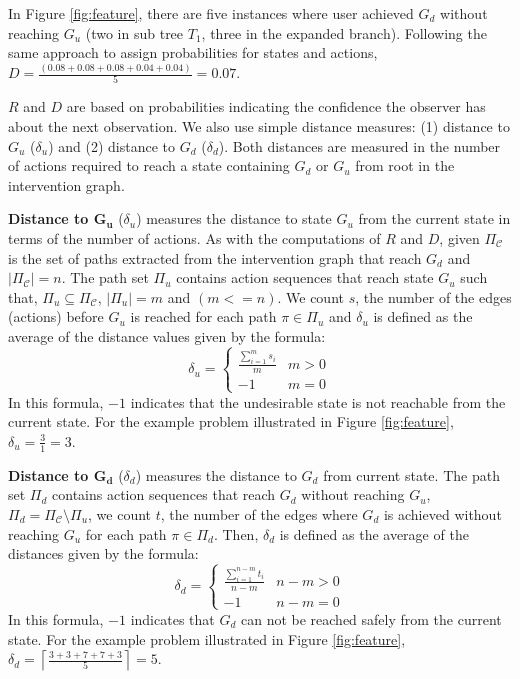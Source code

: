 In Figure \ref{fig:feature}, there are five instances where user achieved $G_d$  without reaching $G_u$ (two in sub tree $T_1$, three in the expanded branch). Following the same approach to assign probabilities for states and actions, $D= \frac{(0.08+0.08+0.08+0.04+0.04)}{5} = 0.07$.

$R$ and $D$ are based on probabilities indicating the confidence the observer has about the next observation. We also use simple distance measures: (1) distance to $G_u$  ($\delta_u$) and (2) distance to $G_d$ ($\delta_d$). Both distances are measured in the number of actions required to reach a state containing $G_d$ or $G_u$ from root in the intervention graph.  

\textbf{Distance to $\boldsymbol{G_u}$} ($\delta_u$) measures the distance to state $G_u$ from the current state in terms of the number of actions. As with the computations of $R$ and $D$, given $\Pi_{\mathcal{C}}$ is the set of paths extracted from the intervention graph that reach $G_d$ and $\left | \Pi_{\mathcal{C}} \right |=n$. The path set $\Pi_{u}$ contains action sequences that reach state $G_u$ such that, $\Pi_{u} \subseteq \Pi_{\mathcal{C}}$, $\left | \Pi_{u} \right |=m$ and $(m<=n)$. We count  $s$, the number of the edges (actions) before $G_u$ is reached for each path $\pi \in \Pi_{u}$ and $\delta_u$ is defined as the average of the distance values given by the formula:
\begin{equation*} 
\delta_u = \left\{\begin{matrix}
\frac{\sum_{i=1}^{m}s_i}{m} & m>0\\ 
-1 &  m=0
\end{matrix}\right.
\end{equation*} 
In this formula, $-1$ indicates that the undesirable state is not reachable from the current state. For the example problem illustrated in Figure \ref{fig:feature}, $\delta_u=\frac{3}{1}=3$. 


\textbf{Distance to $\boldsymbol{G_d}$} ($\delta_d$) measures the distance to $G_d$ from current state. The path set $\Pi_{d}$ contains action sequences that reach $G_d$ without reaching $G_u$, $\Pi_{d} = \Pi_{\mathcal{C}} \setminus \Pi_{u} $, we count  $t$, the number of the edges where $G_d$ is achieved without reaching $G_u$ for each path $\pi \in \Pi_{d}$. Then, $\delta_d$ is defined as the average of the distances given by the formula:
\begin{equation*} 
\delta_d = \left\{\begin{matrix}
\frac{\sum_{i=1}^{n-m}t_i}{n-m} & n-m>0\\ 
-1 &  n-m=0
\end{matrix}\right.
\end{equation*}
In this formula, $-1$ indicates that $G_d$ can not be reached safely from the current state. For the example problem illustrated in Figure \ref{fig:feature}, $\delta_d=\left \lceil \frac{3+3+7+7+3}{5} \right \rceil=5$.


